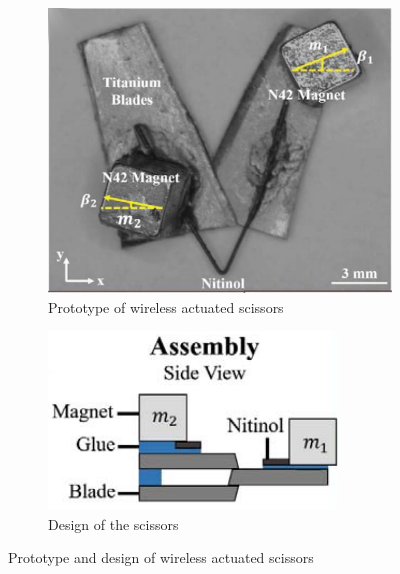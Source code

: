 \begin{figure}[H]
    \centering
    \begin{subfigure}[b]{0.45\textwidth}
        \includegraphics[width=\textwidth]{Figures/scissor_prototype.png}
        \caption{Prototype of wireless actuated scissors}
        \label{fig:scissor_prototype}
    \end{subfigure}
    \qquad 
    \begin{subfigure}[b]{0.45\textwidth}
        \includegraphics[width=\textwidth]{Figures/scissor_design.png}
        \caption{Design of the scissors}
        \label{fig:scissor_design}
    \end{subfigure}
    \caption{Prototype and design of wireless actuated scissors \cite{ScissorActuation}}
    \label{fig:scissors}
\end{figure}
